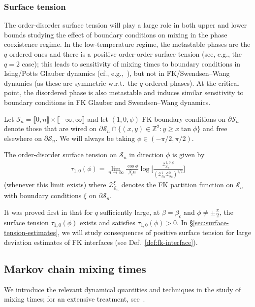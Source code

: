 \documentclass[reqno,11pt]{amsart}
\numberwithin{equation}{section}
\theoremstyle{definition}{
\newtheorem{example}[theorem]{Example}
\newtheorem{definition}[theorem]{Definition}
\newtheorem*{definition*}{Definition}
\newtheorem{problem}[theorem]{Problem}
\newtheorem{question}[theorem]{Question}
\newtheorem{remark}[theorem]{Remark}
}
\newcommand{\llb }{\llbracket}
\newcommand{\rrb }{\rrbracket}
\begin{document}
\subsubsection*{Surface tension}

The order-disorder surface tension will play a large role in both upper and lower bounds studying the effect of boundary conditions on mixing in the phase coexistence regime. In the low-temperature regime, the metastable phases are the $q$ ordered ones and there is a positive order-order surface tension (see,  e.g., the $q=2$ case); this leads to sensitivity of mixing times to boundary conditions in Ising/Potts Glauber dynamics (cf., e.g.,~\cite{Martinelli94,MaTo10}), but not in FK/Swendsen--Wang dynamics (as these are symmetric w.r.t.\ the $q$ ordered phases). At the critical point, the disordered phase is also metastable and induces similar sensitivity to boundary conditions in FK Glauber and Swendsen--Wang dynamics.

Let $\mathcal S_n = \llb 0,n\rrb \times \llb -\infty,\infty\rrb$ and let $(1,0,\phi)$ FK boundary conditions on $\partial \mathcal S_n$ denote those that are wired on $\partial \mathcal S_n \cap \{(x,y)\in \mathbb Z^2:y\geq x \tan \phi\}$ and free elsewhere on $\partial \mathcal S_n$. We will always be taking $\phi \in (-\pi/2, \pi/2)$. 

\begin{definition}\label{def:surface-tension}
The order-disorder surface tension on $\mathcal S_n$ in direction $\phi$ is given by 
\begin{align*}
\tau_{1,0} ( \phi) =   \lim_{n\to\infty} \frac {\cos \phi}{\beta_c n} \log \bigg[\frac{\mathcal Z^{1,0,\phi}_{\mathcal S_n} }{(\mathcal Z^{1}_{\mathcal S_n}\mathcal Z^{0}_{\mathcal S_n})^{1/2}}\bigg]
\end{align*}
(whenever this limit exists) where $\mathcal Z^\xi_{\mathcal S_n}$ denotes the FK partition function on $\mathcal S_n$ with boundary conditions $\xi$ on $\partial \mathcal S_n$. 
\end{definition}
It was proved first in \cite{LMMRS91} that for $q$ sufficiently large, at $\beta=\beta_c$ and $\phi \neq \pm \frac \pi 2$, the surface tension $\tau_{1,0}(\phi)$ exists and satisfies $\tau_{1,0}(\phi)>0$. In \S\ref{sec:surface-tension-estimates}, we will study consequences of positive surface tension for large deviation estimates of FK interfaces (see Def.~\ref{def:fk-interface}).

\subsection{Markov chain mixing times} We introduce the relevant dynamical quantities and techniques in the study of mixing times; for an extensive treatment, see~\cite{LPW17}.
\end{document}
